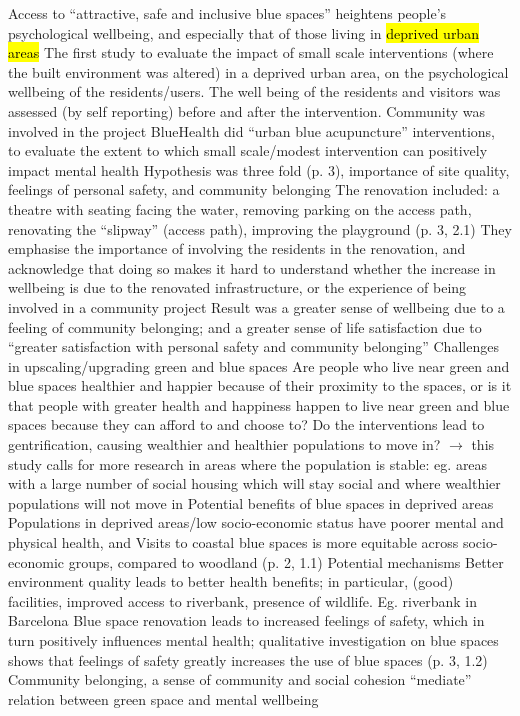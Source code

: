 \documentclass{article}
\begin{document}
\begin{outline}
	\1 Access to ``attractive, safe and inclusive blue spaces'' heightens people's psychological wellbeing, and especially that of those living in \hl{deprived urban areas}
	\1 The first study to evaluate the impact of small scale interventions (where the built environment was altered) in a deprived urban area, on the psychological wellbeing of the residents/users. The well being of the residents and visitors was assessed (by self reporting) before and after the intervention. Community was involved in the project
		\2 BlueHealth did ``urban blue acupuncture'' interventions, to evaluate the extent to which small scale/modest intervention can positively impact mental health
		\2 Hypothesis was three fold (p. 3), importance of site quality, feelings of personal safety, and community belonging
		\2 The renovation included: a theatre with seating facing the water, removing parking on the access path, renovating the ``slipway'' (access path), improving the playground (p. 3, 2.1)
		\2 They emphasise the importance of involving the residents in the renovation, and acknowledge that doing so makes it hard to understand whether the increase in wellbeing is due to the renovated infrastructure, or the experience of being involved in a community project
	\1 Result was a greater sense of wellbeing due to a feeling of community belonging; and a greater sense of life satisfaction due to ``greater satisfaction with personal safety and community belonging''
	\1 Challenges in upscaling/upgrading green and blue spaces
		\2 Are people who live near green and blue spaces healthier and happier because of their proximity to the spaces, or is it that people with greater health and happiness happen to live near green and blue spaces because they can afford to and choose to?
		\2 Do the interventions lead to gentrification, causing wealthier and healthier populations to move in?
		\2 $\rightarrow$ this study calls for more research in areas where the population is stable: eg. areas with a large number of social housing which will stay social and where wealthier populations will not move in
	\1 Potential benefits of blue spaces in deprived areas
		\2 Populations in deprived areas/low socio-economic status have poorer mental and physical health, and 
		\2 Visits to coastal blue spaces is more equitable across socio-economic groups, compared to woodland (p. 2, 1.1)
	\1 Potential mechanisms
		\2 Better environment quality leads to better health benefits; in particular, (good) facilities, improved access to riverbank, presence of wildlife. Eg. riverbank in Barcelona
		\2 Blue space renovation leads to increased feelings of safety, which in turn positively influences mental health; qualitative investigation on blue spaces shows that feelings of safety greatly increases the use of blue spaces (p. 3, 1.2) 
		\2 Community belonging, a sense of community and social cohesion ``mediate'' relation between green space and mental wellbeing
\end{outline}
\end{document}
